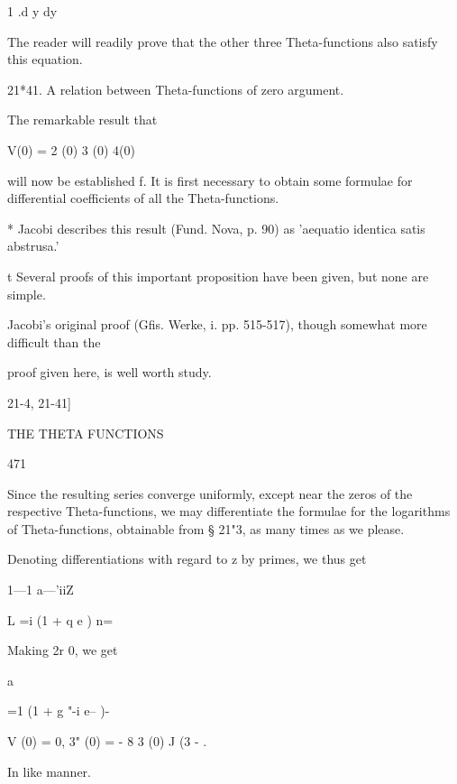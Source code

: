 1 .d y dy   

The reader will readily prove that the other three Theta-functions also 
satisfy this equation. 

21*41. A relation between Theta-functions of zero argument. 

The remarkable result that 

V(0) =  2 (0) 3 (0) 4(0) 

will now be established f. It is first necessary to obtain some formulae for 
differential coefficients of all the Theta-functions. 

* Jacobi describes this result (Fund. Nova, p. 90) as 'aequatio identica satis abstrusa.' 

t Several proofs of this important proposition have been given, but none are simple. 

Jacobi's original proof (Gfis. Werke, i. pp. 515-517), though somewhat more difficult than the 

proof given here, is well worth study. 



21-4, 21-41] 



THE THETA FUNCTIONS 



471 



Since the resulting series converge uniformly, except near the zeros of 
the respective Theta-functions, we may differentiate the formulae for the 
logarithms of Theta-functions, obtainable from § 21"3, as many times as we 
please. 

Denoting differentiations with regard to z by primes, we thus get 






1—1 a—'iiZ 






L =i (1 + q e ) n=\ 

Making 2r   0, we get 



a%



=1 (1 + g "-i e-- )- 



V (0) = 0,  3" (0) = - 8 3 (0) J  (3 - .  



In like manner. 



